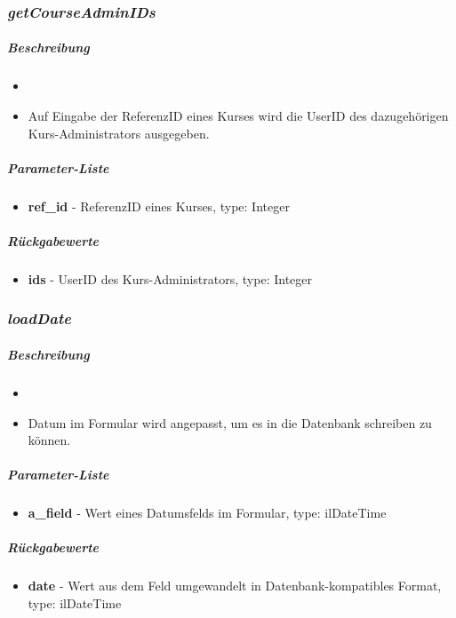 \subsubsection*{\textit{getCourseAdminIDs}}\label{getCourseAdminIDsGDGUI}
\subparagraph{Beschreibung}
\begin{itemize}
	\item[]  \noindent{} 
	\item[] Auf Eingabe der ReferenzID eines Kurses wird die UserID des dazugehörigen Kurs-Administrators ausgegeben.
\end{itemize}
\subparagraph{Parameter-Liste}
\begin{itemize}
	\item[] \textbf{ref\_id} - ReferenzID eines Kurses, type: Integer
\end{itemize}
\subparagraph{Rückgabewerte}
\begin{itemize}
	\item[] \textbf{ids} - UserID des Kurs-Administrators, type: Integer
\end{itemize}

\subsubsection*{\textit{loadDate}}\label{loadDateGDGUI}
\subparagraph{Beschreibung}
\begin{itemize}
	\item[] \noindent{}
	\item[] Datum im Formular wird angepasst, um es in die Datenbank schreiben zu können.
\end{itemize}
\subparagraph{Parameter-Liste}
\begin{itemize}
	\item[] \textbf{a\_field} - Wert eines Datumsfelds im Formular, type: ilDateTime
\end{itemize}
\subparagraph{Rückgabewerte}
\begin{itemize}
	\item[] \textbf{date} - Wert aus dem Feld umgewandelt in Datenbank-kompatibles Format, type: ilDateTime
\end{itemize}

